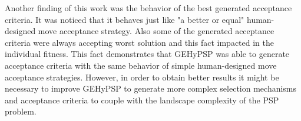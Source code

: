 	Another finding of this work was the behavior of the best generated acceptance criteria. It was noticed that it behaves just like "a better or equal" human-designed move acceptance strategy. Also some of the generated acceptance criteria were always accepting worst solution and this fact impacted in the individual fitness. This fact demonstrates that GEHyPSP was able to generate acceptance criteria with the same behavior of simple human-designed move acceptance strategies. However, in order to obtain better results it might be necessary to improve GEHyPSP to generate more complex selection mechanisms and acceptance criteria to couple with the landscape complexity of the PSP problem. 
	
	
	
